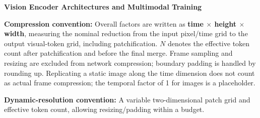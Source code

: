 

{\sffamily\bfseries\color{notesblue}\fontsize{23}{28}\selectfont Vision Encoder Architectures and Multimodal Training\par}
\vspace{1mm}{\color{notesblue}\rule{\linewidth}{0.8pt}}\par\vspace{1mm}
{\small {\bfseries Compression convention:} Overall factors are written as {\bfseries time \(\times\) height \(\times\) width}, measuring the nominal reduction from the input pixel/\allowbreak{}time grid to the output visual-\allowbreak{}token grid, including patchification.\allowbreak{} \(N\) denotes the effective token count after patchification and before the final merge.\allowbreak{} Frame sampling and resizing are excluded from network compression; boundary padding is handled by rounding up.\allowbreak{} Replicating a static image along the time dimension does not count as actual frame compression; the temporal factor of 1 for images is a placeholder.\allowbreak{}}\par\vspace{2pt}
{\small {\bfseries Dynamic-\allowbreak{}resolution convention:} A variable two-\allowbreak{}dimensional patch grid and effective token count, allowing resizing/\allowbreak{}padding within a budget.\allowbreak{}}\par\vspace{2pt}
\begingroup
\fontsize{9.5pt}{12pt}\selectfont
\setlength{\tabcolsep}{5pt}
\renewcommand{\arraystretch}{1.02}
\setlength{\extrarowheight}{2pt}
\setlength{\LTpre}{5pt}
\setlength{\LTpost}{6pt}
\setlength{\parskip}{0pt}
\setlength{\emergencystretch}{2em}
